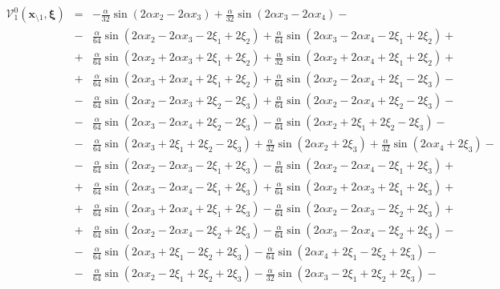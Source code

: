 \documentclass[11pt]{jfm}
\numberwithin{equation}{section}
\begin{document}
\begin{eqnarray}
\label{A2}
\mathcal{V}_1^0(\boldsymbol{x}_{\setminus 1}, \boldsymbol{\xi}) &=&-\frac{\alpha}{32}   \sin (2 \alpha x_2-2 \alpha x_3)+\frac{\alpha}{32}   \sin (2 \alpha x_3-2 \alpha x_4)- \nonumber\\
&-&\frac{\alpha}{64}  \sin (2 \alpha x_2-2 \alpha x_3-2 \xi_1+2 \xi_2)+\frac{\alpha}{64}  \sin (2 \alpha x_3-2 \alpha x_4-2 \xi_1+2 \xi_2)+ \nonumber\\
&+&\frac{\alpha}{64}  \sin (2 \alpha x_2+2 \alpha x_3+2 \xi_1+2 \xi_2)+\frac{\alpha}{32}   \sin (2 \alpha x_2+2 \alpha x_4+2 \xi_1+2 \xi_2)+ \nonumber\\
&+&\frac{\alpha}{64}  \sin (2 \alpha x_3+2 \alpha x_4+2 \xi_1+2 \xi_2)+\frac{\alpha}{64}  \sin (2 \alpha x_2-2 \alpha x_4+2 \xi_1-2 \xi_3)- \nonumber\\
&-&\frac{\alpha}{64}  \sin (2 \alpha x_2-2 \alpha x_3+2 \xi_2-2 \xi_3)+\frac{\alpha}{64}  \sin (2 \alpha x_2-2 \alpha x_4+2 \xi_2-2 \xi_3)- \nonumber\\
&-&\frac{\alpha}{64}  \sin (2 \alpha x_3-2 \alpha x_4+2 \xi_2-2 \xi_3)-\frac{\alpha}{64}  \sin (2 \alpha x_2+2 \xi_1+2 \xi_2-2 \xi_3)- \nonumber\\
&-&\frac{\alpha}{64}  \sin (2 \alpha x_3\!+\!2 \xi_1\!+\!2 \xi_2-2 \xi_3)\!+\!\frac{\alpha}{32}   \sin (2 \alpha x_2\!+\!2 \xi_3)\!+\!\frac{\alpha}{32}   \sin (2 \alpha x_4\!+\!2 \xi_3)- \nonumber\\
&-&\frac{\alpha}{64}  \sin (2 \alpha x_2-2 \alpha x_3-2 \xi_1+2 \xi_3)-\frac{\alpha}{64}  \sin (2 \alpha x_2-2 \alpha x_4-2 \xi_1+2 \xi_3)+ \nonumber\\
&+&\frac{\alpha}{64}  \sin (2 \alpha x_3-2 \alpha x_4-2 \xi_1+2 \xi_3)+\frac{\alpha}{64}  \sin (2 \alpha x_2+2 \alpha x_3+2 \xi_1+2 \xi_3)+ \nonumber\\
&+&\frac{\alpha}{64}  \sin (2 \alpha x_3+2 \alpha x_4+2 \xi_1+2 \xi_3)-\frac{\alpha}{64}  \sin (2 \alpha x_2-2 \alpha x_3-2 \xi_2+2 \xi_3)+ \nonumber\\
&+&\frac{\alpha}{64}  \sin (2 \alpha x_2-2 \alpha x_4-2 \xi_2+2 \xi_3)-\frac{\alpha}{64}  \sin (2 \alpha x_3-2 \alpha x_4-2 \xi_2+2 \xi_3)- \nonumber\\
&-&\frac{\alpha}{64}  \sin (2 \alpha x_3+2 \xi_1-2 \xi_2+2 \xi_3)-\frac{\alpha}{64}  \sin (2 \alpha x_4+2 \xi_1-2 \xi_2+2 \xi_3)- \nonumber\\
&-&\frac{\alpha}{64}  \sin (2 \alpha x_2-2 \xi_1+2 \xi_2+2 \xi_3)-\frac{\alpha}{32}   \sin (2 \alpha x_3-2 \xi_1+2 \xi_2+2 \xi_3)- \nonumber\\

\end{eqnarray}
\end{document}
